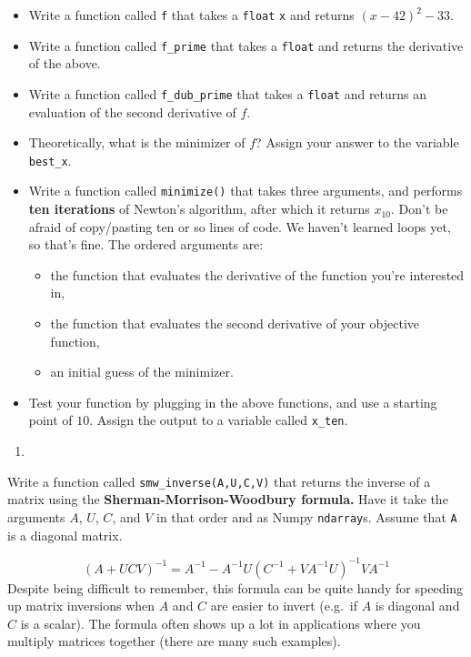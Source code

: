 \documentclass[
  12pt,
]{krantz}
\providecommand{\tightlist}{%
  \setlength{\itemsep}{0pt}\setlength{\parskip}{0pt}}
\begin{document}
\begin{itemize}
\tightlist
\item
  Write a function called \texttt{f} that takes a \texttt{float} \texttt{x} and returns \((x-42)^2 - 33\).
\item
  Write a function called \texttt{f\_prime} that takes a \texttt{float} and returns the derivative of the above.
\item
  Write a function called \texttt{f\_dub\_prime} that takes a \texttt{float} and returns an evaluation of the second derivative of \(f\).
\item
  Theoretically, what is the minimizer of \(f\)? Assign your answer to the variable \texttt{best\_x}.
\item
  Write a function called \texttt{minimize()} that takes three arguments, and performs \textbf{ten iterations} of Newton's algorithm, after which it returns \(x_{10}\). Don't be afraid of copy/pasting ten or so lines of code. We haven't learned loops yet, so that's fine. The ordered arguments are:

  \begin{itemize}
  \tightlist
  \item
    the function that evaluates the derivative of the function you're interested in,
  \item
    the function that evaluates the second derivative of your objective function,
  \item
    an initial guess of the minimizer.
  \end{itemize}
\item
  Test your function by plugging in the above functions, and use a starting point of \(10\). Assign the output to a variable called \texttt{x\_ten}.
\end{itemize}

\begin{enumerate}
\def\labelenumi{\arabic{enumi}.}
\setcounter{enumi}{1}
\tightlist
\item
\end{enumerate}

Write a function called \texttt{smw\_inverse(A,U,C,V)} that returns the inverse of a matrix using the \textbf{Sherman-Morrison-Woodbury formula.} Have it take the arguments \(A\), \(U\), \(C\), and \(V\) in that order and as Numpy \texttt{ndarray}s. Assume that \texttt{A} is a diagonal matrix.

\[
(A + UCV)^{-1} = A^{-1} - A^{-1}U(C^{-1} + VA^{-1}U)^{-1}V A^{-1}
\]
Despite being difficult to remember, this formula can be quite handy for speeding up matrix inversions when \(A\) and \(C\) are easier to invert (e.g.~if \(A\) is diagonal and \(C\) is a scalar). The formula often shows up a lot in applications where you multiply matrices together (there are many such examples).
\end{document}
